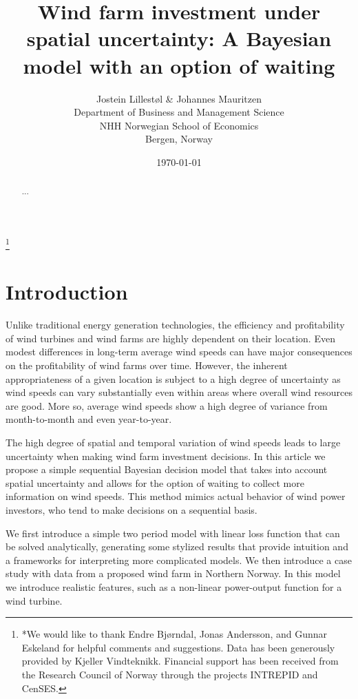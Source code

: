 \documentclass[11pt]{article}
\title{Wind farm investment under spatial uncertainty: A Bayesian model with an option of waiting}
\author{Jostein Lillest\o l \& Johannes Mauritzen\\
 		Department of Business and Management Science\\
   NHH Norwegian School of Economics\\
   Bergen, Norway\\
		}
\date{\today}
\begin{document}
\begin{spacing}{1} %

\maketitle

\begin{abstract}
 ...
\end{abstract}

\thanks{*We would like to thank Endre Bj\o rndal, Jonas Andersson, and Gunnar Eskeland for helpful comments and suggestions. Data has been generously provided by Kjeller Vindteknikk. Financial support has been received from the Research Council of Norway through the projects INTREPID and CenSES.}
\end{spacing}

\section{Introduction}

Unlike traditional energy generation technologies, the efficiency and profitability of wind turbines and wind farms are highly dependent on their location. Even modest differences in long-term average wind speeds can have major consequences on the profitability of wind farms over time. However, the inherent appropriateness of a given location is subject to a high degree of uncertainty as wind speeds can vary substantially even within areas where overall wind resources are good. More so, average wind speeds show a high degree of variance from month-to-month and even year-to-year.

The high degree of spatial and temporal variation of wind speeds leads to large uncertainty when making wind farm investment decisions. In this article we propose a simple sequential Bayesian decision model that takes into account spatial uncertainty and allows for the option of waiting to collect more information on wind speeds. This method mimics actual behavior of wind power investors, who tend to make decisions on a sequential basis. 

We first introduce a simple two period model with linear loss function that can be solved analytically, generating some stylized results that provide intuition and a frameworks for interpreting more complicated models. We then introduce a case study with data from a proposed wind farm in Northern Norway. In this model we introduce realistic features, such as a non-linear power-output function for a wind turbine.
\end{document}
